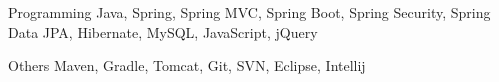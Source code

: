 
\begin{cvskills}

  \cvskill
  {Programming} %
  {Java, Spring, Spring MVC, Spring Boot, Spring Security, Spring Data JPA, Hibernate, MySQL, JavaScript, jQuery} %

  \cvskill
    {Others} %
    {Maven, Gradle, Tomcat, Git, SVN, Eclipse, Intellij} %

\end{cvskills}

